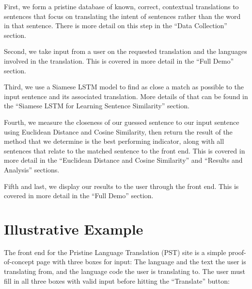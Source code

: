 \documentclass[runningheads]{llncs}
\begin{document}
	First, we form a pristine database of known, correct, contextual translations to sentences that focus on translating the intent of sentences rather than the word in that sentence. There is more detail on this step in the ``Data Collection'' section. 

	Second, we take input from a user on the requested translation and the languages involved in the translation. This is covered in more detail in the ``Full Demo'' section. 

	Third, we use a Siamese LSTM model to find as close a match as possible to the input sentence and its associated translation.  More details of that can be found in the ``Siamese LSTM for Learning Sentence Similarity'' section. 

	Fourth, we measure the closeness of our guessed sentence to our input sentence using Euclidean Distance and Cosine Similarity, then return the result of the method that we determine is the best performing indicator, along with all sentences that relate to the matched sentence to the front end. This is covered in more detail in the ``Euclidean Distance and Cosine Similarity'' and ``Results and Analysis'' sections.

	Fifth and last, we display our results to the user through the front end. This is covered in more detail in the ``Full Demo'' section.
	
	
	\section{Illustrative Example}
	The front end for the Pristine Language Translation (PST) site is a simple proof-of-concept page with three boxes for input: The language and the text the user is translating from, and the language code the user is translating to. The user must fill in all three boxes with valid input before hitting the ``Translate'' button:

	\begin{minipage}{\linewidth}
		\begin{center}
  			 \noindent{}
			\label{fig:Language Input}
			\vspace*{1cm}
		\end{center}
	\end{minipage}
	\afterpage{\clearpage}
\end{document}

